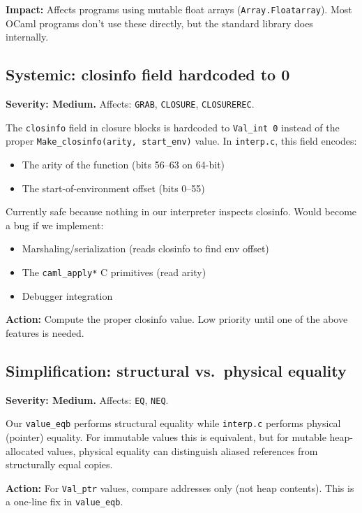 \documentclass[11pt,a4paper]{article}
\begin{document}
\textbf{Impact:} Affects programs using mutable float arrays (\texttt{Array.Floatarray}).
Most OCaml programs don't use these directly, but the standard library does
internally.

\subsection{Systemic: closinfo field hardcoded to 0}
\label{action:closinfo}

\textbf{Severity: Medium.}
Affects: \texttt{GRAB}, \texttt{CLOSURE}, \texttt{CLOSUREREC}.

The \texttt{closinfo} field in closure blocks is hardcoded to \texttt{Val\_int 0}
instead of the proper \texttt{Make\_closinfo(arity, start\_env)} value.  In
\texttt{interp.c}, this field encodes:
\begin{itemize}
  \item The arity of the function (bits 56--63 on 64-bit)
  \item The start-of-environment offset (bits 0--55)
\end{itemize}

Currently safe because nothing in our interpreter inspects closinfo.  Would
become a bug if we implement:
\begin{itemize}
  \item Marshaling/serialization (reads closinfo to find env offset)
  \item The \texttt{caml\_apply*} C primitives (read arity)
  \item Debugger integration
\end{itemize}

\textbf{Action:} Compute the proper closinfo value.  Low priority until
one of the above features is needed.

\subsection{Simplification: structural vs.\ physical equality}
\label{action:equality}

\textbf{Severity: Medium.}
Affects: \texttt{EQ}, \texttt{NEQ}.

Our \texttt{value\_eqb} performs structural equality while \texttt{interp.c}
performs physical (pointer) equality.  For immutable values this is equivalent,
but for mutable heap-allocated values, physical equality can distinguish
aliased references from structurally equal copies.

\textbf{Action:} For \texttt{Val\_ptr} values, compare addresses only (not
heap contents).  This is a one-line fix in \texttt{value\_eqb}.
\end{document}

